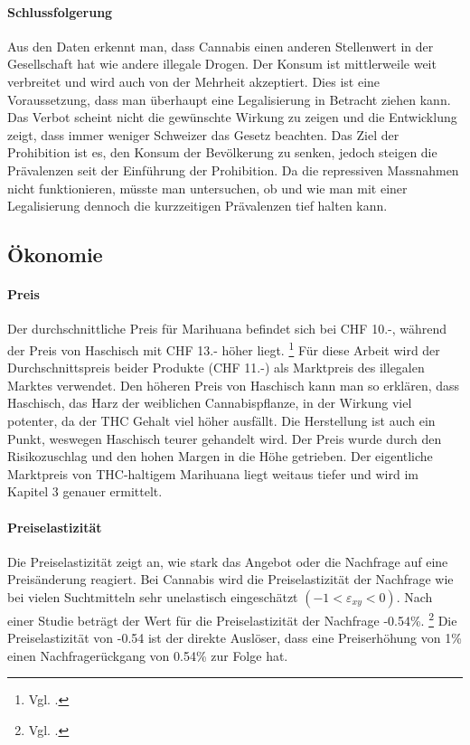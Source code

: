 \documentclass[../main.tex]{subfiles}
\begin{document}
	\paragraph{Schlussfolgerung}
	Aus den Daten erkennt man, dass Cannabis einen anderen Stellenwert in der Gesellschaft hat wie andere illegale Drogen.
	Der Konsum ist mittlerweile weit verbreitet und wird auch von der Mehrheit akzeptiert.
	Dies ist eine Voraussetzung, dass man überhaupt eine Legalisierung in Betracht ziehen kann.
	Das Verbot scheint nicht die gewünschte Wirkung zu zeigen und die Entwicklung zeigt, dass immer weniger Schweizer das Gesetz beachten.
	Das Ziel der Prohibition ist es, den Konsum der Bevölkerung zu senken, jedoch steigen die Prävalenzen seit der Einführung der Prohibition.
	Da die repressiven Massnahmen nicht funktionieren, müsste man untersuchen, ob und wie man mit einer Legalisierung dennoch die kurzzeitigen Prävalenzen tief halten kann.
	
	
	\subsection{Ökonomie}
	
	\paragraph{Preis}
	Der durchschnittliche Preis für Marihuana befindet sich bei CHF 10.-, während der Preis von Haschisch mit CHF 13.- höher liegt.%
	\footnote{Vgl. \cite[12]{zobel}.}
	Für diese Arbeit wird der Durchschnittspreis beider Produkte (CHF 11.-) als Marktpreis des illegalen Marktes verwendet.
	Den höheren Preis von Haschisch kann man so erklären, dass Haschisch, das Harz der weiblichen Cannabispflanze, in der Wirkung viel potenter, da der THC Gehalt viel höher ausfällt.
	Die Herstellung ist auch ein Punkt, weswegen Haschisch teurer gehandelt wird.
	Der Preis wurde durch den Risikozuschlag und den hohen Margen in die Höhe getrieben.
	Der eigentliche Marktpreis von THC-haltigem Marihuana liegt weitaus tiefer und wird im Kapitel 3 genauer ermittelt.
	
	\paragraph{Preiselastizität}
	Die Preiselastizität zeigt an, wie stark das Angebot oder die Nachfrage auf eine Preisänderung reagiert.
	Bei Cannabis wird die Preiselastizität der Nachfrage wie bei vielen Suchtmitteln sehr unelastisch eingeschätzt $(-1<\varepsilon_{xy}<0)$. 
	Nach einer Studie beträgt der Wert für die Preiselastizität der Nachfrage -0.54\%.%
	\footnote{Vgl. \cite[24]{golzar}.}
	Die Preiselastizität von -0.54 ist der direkte Auslöser, dass eine Preiserhöhung von 1\% einen Nachfragerückgang von 0.54\% zur Folge hat.\\
	
\end{document}
